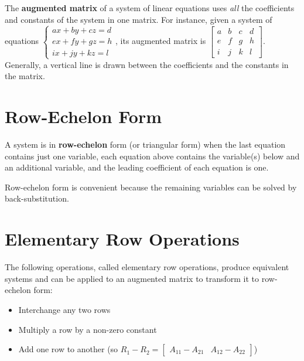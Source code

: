 \documentclass{report}
\begin{document}
The \textbf{augmented matrix} of a system of linear equations uses \textit{all} the coefficients and constants of the system in one matrix. For instance, given a system of equations 
$
    \begin{cases}
        ax+by+cz=d \\
        ex+fy+gz=h \\
        ix+jy+kz=l
    \end{cases}
$, 
its augmented matrix is 
$
    \begin{bmatrix}
        a & b & c & d \\
        e & f & g & h \\
        i & j & k & l
    \end{bmatrix}
$. Generally, a vertical line is drawn between the coefficients and the constants in the matrix.

\section{Row-Echelon Form}

A system is in \textbf{row-echelon} form (or triangular form) when the last equation contains just one variable, each equation above contains the variable(s) below and an additional variable, and the leading coefficient of each equation is one.


Row-echelon form is convenient because the remaining variables can be solved by back-substitution.

\section{Elementary Row Operations}

The following operations, called elementary row operations, produce equivalent systems and can be applied to an augmented matrix to transform it to row-echelon form:
\begin{itemize}
    \item Interchange any two rows
    \item Multiply a row by a non-zero constant
    \item Add one row to another (so $R_1-R_2=\begin{bmatrix}A_{11}-A_{21} & A_{12}-A_{22}\end{bmatrix}$)
\end{itemize}
\end{document}
